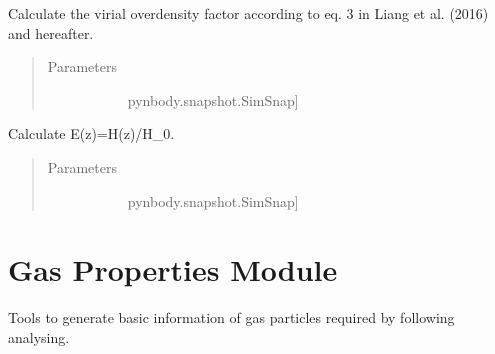\documentclass[letterpaper,10pt,english]{sphinxmanual}
\begin{document}
\begin{fulllineitems}
\label{\detokenize{cosmology:modules.cosmology.Delta_vir}}
Calculate the virial overdensity factor according
to eq. 3 in Liang et al. (2016) and hereafter.
\begin{quote}\begin{description}
\item[{Parameters}] \leavevmode\begin{description}
\item[{}] \leavevmode{[}pynbody.snapshot.SimSnap{]}
\end{description}

\end{description}\end{quote}

\end{fulllineitems}


\begin{fulllineitems}
\label{\detokenize{cosmology:modules.cosmology.Ez}}
Calculate E(z)=H(z)/H\_0.
\begin{quote}\begin{description}
\item[{Parameters}] \leavevmode\begin{description}
\item[{}] \leavevmode{[}pynbody.snapshot.SimSnap{]}
\end{description}

\end{description}\end{quote}

\end{fulllineitems}



\section{Gas Properties Module}
\label{\detokenize{gas_properties:module-modules.gas_properties}}\label{\detokenize{gas_properties:gas-properties-module}}\label{\detokenize{gas_properties::doc}}
Tools to generate basic information of gas particles
required by following analysing.
\end{document}
